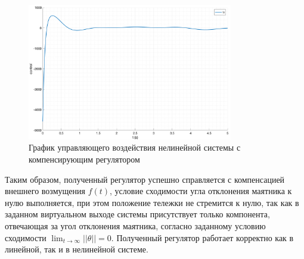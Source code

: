 \begin{figure}[ht!]
    \centering
    \includegraphics[width=0.8\textwidth]{media/plots/compensation/u_1.png}
    \caption{График управляющего воздействия нелинейной системы с компенсирующим регулятором}
    \label{fig:compensation_nlin_control}
\end{figure}
\FloatBarrier
Таким образом, полученный регулятор успешно справляется с компенсацией внешнего возмущения $f(t)$,
условие сходимости угла отклонения маятника к нулю выполняется, при этом положение тележки не стремится к нулю, 
так как в заданном виртуальном выходе системы присутствует только компонента, отвечающая за угол отклонения маятника, 
согласно заданному условию сходимости $\lim_{t\to\infty} ||\theta|| = 0$.
Полученный регулятор работает корректно как в линейной, так и в нелинейной системе. 

